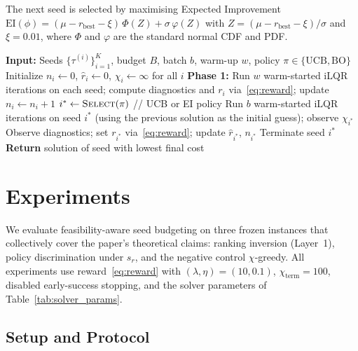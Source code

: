 \documentclass[lettersize,journal]{IEEEtran}
\begin{document}
The next seed is selected by maximising Expected Improvement~\cite{srinivas2010}
$\text{EI}(\phi) = (\mu - r_{\text{best}} - \xi)\,\Phi(Z) + \sigma\,\varphi(Z)$
with $Z = (\mu - r_{\text{best}} - \xi)/\sigma$ and $\xi = 0.01$, where $\Phi$ and $\varphi$ are the standard normal CDF and PDF.

\begin{algorithm}[t]
\caption{Feasibility-Aware Seed Budgeting}
\label{alg:budgeting}
\begin{algorithmic}[1]
\STATE \textbf{Input:} Seeds $\{\tau^{(i)}\}_{i=1}^K$, budget $B$, batch $b$, warm-up $w$, policy $\pi \in \{\text{UCB}, \text{BO}\}$
\STATE Initialize $n_i \gets 0$, $\hat{r}_i \gets 0$, $\chi_i \gets \infty$ for all $i$
\STATE \textbf{Phase 1:} Run $w$ warm-started iLQR iterations on each seed; compute diagnostics and $r_i$ via~\eqref{eq:reward}; update $n_i \gets n_i + 1$
    \STATE $i^* \gets \textsc{Select}(\pi)$ \quad // UCB or EI policy
    \STATE Run $b$ warm-started iLQR iterations on seed $i^*$ (using the previous solution as the initial guess); observe $\chi_{i^*}$
    \STATE Observe diagnostics; set $r_{i^*}$ via~\eqref{eq:reward}; update $\hat{r}_{i^*}$, $n_{i^*}$
     \STATE Terminate seed $i^*$ \ENDIF
\ENDFOR
\STATE \textbf{Return} solution of seed with lowest final cost
\end{algorithmic}
\end{algorithm}

\section{Experiments}
\label{sec:experiments}

We evaluate feasibility-aware seed budgeting on three frozen instances that
collectively cover the paper's theoretical claims: ranking inversion
(Layer~1), policy discrimination under $s_r$, and the negative control
$\chi$-greedy.  All experiments use reward~\eqref{eq:reward} with
$(\lambda,\eta)=(10,0.1)$, $\chi_{\mathrm{term}}=100$, disabled
early-success stopping, and the solver parameters of
Table~\ref{tab:solver_params}.

\subsection{Setup and Protocol}
\label{sec:setup}
\end{document}
